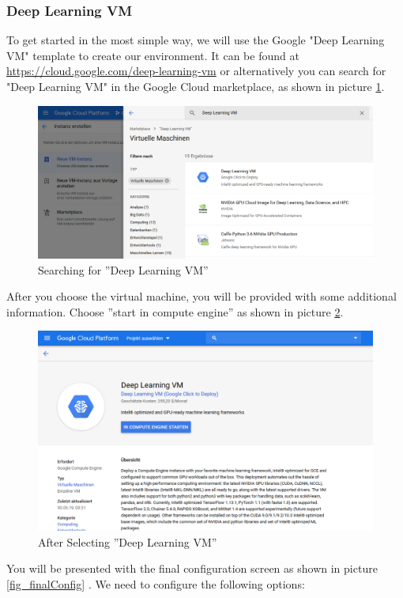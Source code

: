 \documentclass[a4paper]{article}
\begin{document}
\subsubsection{Deep Learning VM}
To get started in the most simple way, we will use the Google "Deep Learning VM" template to create our environment. It can be found at \url{https://cloud.google.com/deep-learning-vm} or alternatively you can search for "Deep Learning VM" in the Google Cloud marketplace, as shown in picture \ref{fig_marketplaceSearch}.
\begin{figure}[H]
	\centerline{\includegraphics[width=\textwidth]{img/marketplaceSearch}}
	\caption{Searching for ''Deep Learning VM''}
	\label{fig_marketplaceSearch}
\end{figure}
\noindent After you choose the virtual machine, you will be provided with some additional information. Choose ''start in compute engine'' as shown in picture \ref{fig_additionalInfo}.
\begin{figure}[H]
	\centerline{\includegraphics[width=\textwidth]{img/additionalInfo}}
	\caption{After Selecting ''Deep Learning VM''}
	\label{fig_additionalInfo}
\end{figure}
You will be presented with the final configuration screen as shown in picture \ref*{fig_finalConfig} . We need to configure the following options:
\end{document}
